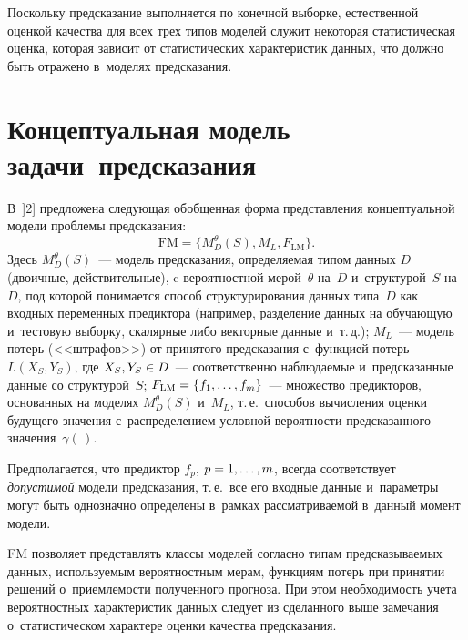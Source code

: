 \begin{multicols}{2}
  Поскольку предсказание выполняется по конечной выборке, естественной 
оценкой качества для всех трех типов моделей служит некоторая 
статистическая оценка, которая зависит от статистических характеристик 
данных, что должно быть отражено в~моделях предсказания.


\section{Концептуальная модель задачи~предсказания}


  В~]2] предложена следующая обобщенная форма представления 
концептуальной модели проблемы предсказания:
  \begin{equation}
  \mathrm{FM}=\{M^\theta_D(S), M_L, F_{\mathrm{LM}}\}.
  \label{e1-fr}
  \end{equation}
Здесь $M^\theta_D(S)$~--- модель предсказания, опре\-де\-ля\-емая типом данных 
$D$ (двоичные, действительные), c вероятностной мерой~$\theta$ на~$D$ 
и~структурой~$S$ на~$D$, под которой понимается способ структурирования 
данных типа~$D$ как входных переменных предиктора (например, 
разделение данных на обуча\-ющую и~тес\-то\-вую выборку, скалярные либо 
векторные данные и~т.\,д.); 
   $M_L$~--- модель потерь (<<штрафов>>) от принятого предсказания 
с~функцией потерь $L(X_S,Y_S)$, где $X_S, Y_S \hm\in D$~--- 
соответственно наблюдаемые и~предсказанные данные со структурой~$S$; 
  $F_{\mathrm{LM}}\hm =\{f_1, \ldots , f_m\}$~--- множество предикторов, основанных на 
моделях $M_D^\theta(S)$ и~$M_L$,  т.\,е.\ способов вычисления оценки 
будущего значения с~распределением условной вероятности предсказанного 
значения~$\gamma(\,)$. 
  
  Предполагается, что предиктор $f_p$, $p\hm=1, \ldots, m$, всегда 
соответствует \textit{допустимой} модели предсказания, т.\,е.\ все его 
входные данные и~параметры могут быть однозначно определены в~рамках 
рассматриваемой в~данный момент модели. 
  
  FM позволяет представлять классы моделей согласно типам 
предсказываемых данных, используемым вероятностным мерам, функциям 
потерь при принятии решений о~приемлемости полученного прогноза. При 
этом необходимость учета вероятностных характеристик данных следует из 
сделанного выше замечания о~статистическом характере оценки качества 
предсказания.


\end{multicols}
